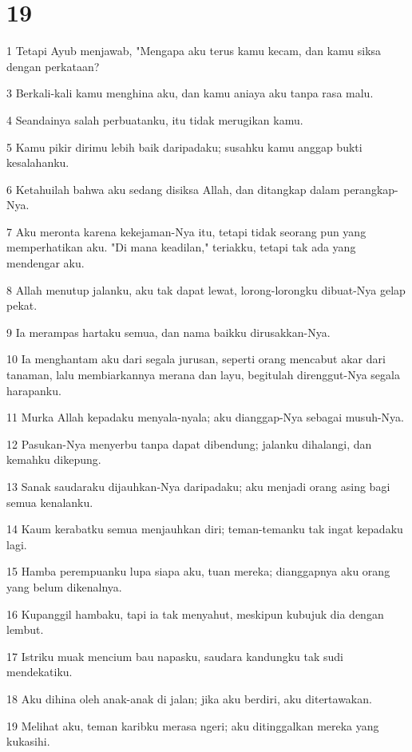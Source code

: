\chapter{19}

\par 1 Tetapi Ayub menjawab, "Mengapa aku terus kamu kecam, dan kamu siksa dengan perkataan?
\par 3 Berkali-kali kamu menghina aku, dan kamu aniaya aku tanpa rasa malu.
\par 4 Seandainya salah perbuatanku, itu tidak merugikan kamu.
\par 5 Kamu pikir dirimu lebih baik daripadaku; susahku kamu anggap bukti kesalahanku.
\par 6 Ketahuilah bahwa aku sedang disiksa Allah, dan ditangkap dalam perangkap-Nya.
\par 7 Aku meronta karena kekejaman-Nya itu, tetapi tidak seorang pun yang memperhatikan aku. "Di mana keadilan," teriakku, tetapi tak ada yang mendengar aku.
\par 8 Allah menutup jalanku, aku tak dapat lewat, lorong-lorongku dibuat-Nya gelap pekat.
\par 9 Ia merampas hartaku semua, dan nama baikku dirusakkan-Nya.
\par 10 Ia menghantam aku dari segala jurusan, seperti orang mencabut akar dari tanaman, lalu membiarkannya merana dan layu, begitulah direnggut-Nya segala harapanku.
\par 11 Murka Allah kepadaku menyala-nyala; aku dianggap-Nya sebagai musuh-Nya.
\par 12 Pasukan-Nya menyerbu tanpa dapat dibendung; jalanku dihalangi, dan kemahku dikepung.
\par 13 Sanak saudaraku dijauhkan-Nya daripadaku; aku menjadi orang asing bagi semua kenalanku.
\par 14 Kaum kerabatku semua menjauhkan diri; teman-temanku tak ingat kepadaku lagi.
\par 15 Hamba perempuanku lupa siapa aku, tuan mereka; dianggapnya aku orang yang belum dikenalnya.
\par 16 Kupanggil hambaku, tapi ia tak menyahut, meskipun kubujuk dia dengan lembut.
\par 17 Istriku muak mencium bau napasku, saudara kandungku tak sudi mendekatiku.
\par 18 Aku dihina oleh anak-anak di jalan; jika aku berdiri, aku ditertawakan.
\par 19 Melihat aku, teman karibku merasa ngeri; aku ditinggalkan mereka yang kukasihi.
